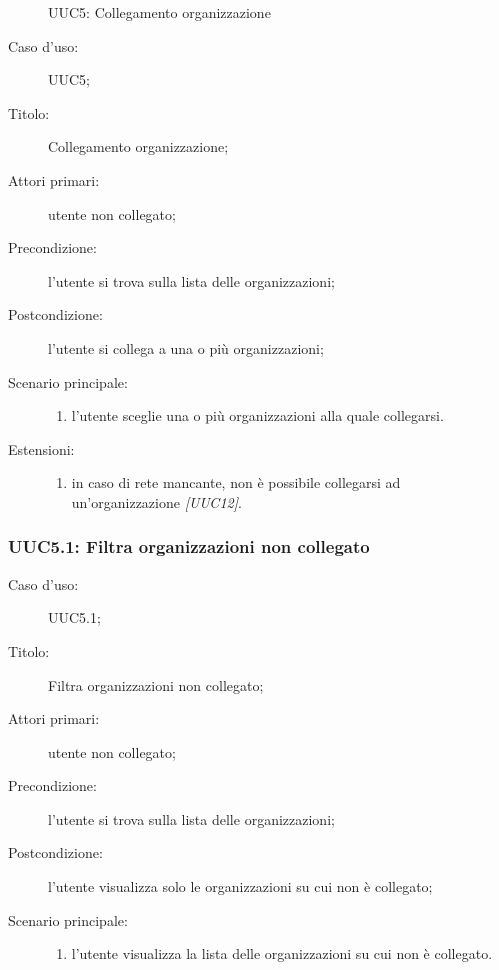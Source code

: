\documentclass[../../../analisi-dei-requisiti.tex]{subfiles}
\begin{document}
\begin{figure}[H]
  \centering
  \caption{UUC5: Collegamento organizzazione}%
  \label{fig:uuc5}
\end{figure}

\begin{description}
  \item[Caso d’uso:] UUC5;
  \item[Titolo:] Collegamento organizzazione;
  \item[Attori primari:] utente non collegato;
  \item[Precondizione:] l'utente si trova sulla lista delle organizzazioni;
  \item[Postcondizione:] l'utente si collega a una o più organizzazioni;
  \item[Scenario principale:]
        \begin{enumerate}
          \item l'utente sceglie una o più organizzazioni alla quale collegarsi.
        \end{enumerate}
  \item[Estensioni:]
        \begin{enumerate}
          \item in caso di rete mancante, non è possibile collegarsi ad un'organizzazione \emph{[UUC12]}.
        \end{enumerate}
\end{description}


\subsubsection{UUC5.1: Filtra organizzazioni non collegato}%
\begin{description}
  \item[Caso d’uso:] UUC5.1;
  \item[Titolo:] Filtra organizzazioni non collegato;
  \item[Attori primari:] utente non collegato;
  \item[Precondizione:] l'utente si trova sulla lista delle organizzazioni;
  \item[Postcondizione:] l'utente visualizza solo le organizzazioni su cui non è collegato;
  \item[Scenario principale:]
        \begin{enumerate}
          \item l'utente visualizza la lista delle organizzazioni su cui non è collegato.
        \end{enumerate}
\end{description}
\end{document}
